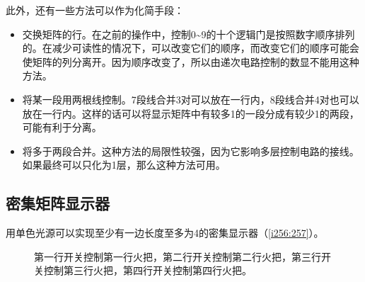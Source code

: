 此外，还有一些方法可以作为化简手段：
\begin{itemize}
\item 交换矩阵的行。在之前的操作中，控制0\~{}9的十个逻辑门是按照数字顺序排列的。在减少可读性的情况下，可以改变它们的顺序，而改变它们的顺序可能会使矩阵的列分离开。因为顺序改变了，所以由递次电路控制的数显不能用这种方法。
\item 将某一段用两根线控制。7段线合并3对可以放在一行内，8段线合并4对也可以放在一行内。这样的话可以将显示矩阵中有较多1的一段分成有较少1的两段，可能有利于分离。
\item 将多于两段合并。这种方法的局限性较强，因为它影响多层控制电路的接线。如果最终可以只化为1层，那么这种方法可用。
\end{itemize}

\subsection{密集矩阵显示器}
用单色光源可以实现至少有一边长度至多为4的密集显示器（\autoref{i256:257}）。

\begin{figure}[!ht]
\begin{center}
\qquad
{}
\end{center}
\caption{第一行开关控制第一行火把，第二行开关控制第二行火把，第三行开关控制第三行火把，第四行开关控制第四行火把。}
\label{i256:257}
\end{figure}

